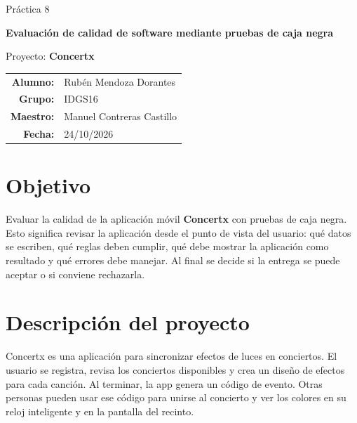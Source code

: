 \documentclass[11pt,a4paper]{article}
\begin{document}
\begin{titlepage}
  \centering
  \vspace*{2cm}

  {\large Práctica 8}

  \vspace{2.5cm}

  {\Huge\bfseries Evaluación de calidad de software mediante pruebas de caja negra}

  \vspace{1.2cm}

  {\Large Proyecto: \textbf{Concertx}}

  \vspace{3cm}

  {\large
  \begin{tabular}{rl}
    \textbf{Alumno:} & Rubén Mendoza Dorantes \\[6pt]
    \textbf{Grupo:} & IDGS16 \\[6pt]
    \textbf{Maestro:} & Manuel Contreras Castillo \\[6pt]
    \textbf{Fecha:} & 24/10/2026
  \end{tabular}
  }

  \vfill
\end{titlepage}


\section*{Objetivo}

Evaluar la calidad de la aplicación móvil \textbf{Concertx} con pruebas de caja negra. Esto significa revisar la aplicación desde el punto de vista del usuario: qué datos se escriben, qué reglas deben cumplir, qué debe mostrar la aplicación como resultado y qué errores debe manejar. Al final se decide si la entrega se puede aceptar o si conviene rechazarla.

\section*{Descripción del proyecto}

Concertx es una aplicación para sincronizar efectos de luces en conciertos. El usuario se registra, revisa los conciertos disponibles y crea un diseño de efectos para cada canción. Al terminar, la app genera un código de evento. Otras personas pueden usar ese código para unirse al concierto y ver los colores en su reloj inteligente y en la pantalla del recinto.
\end{document}
